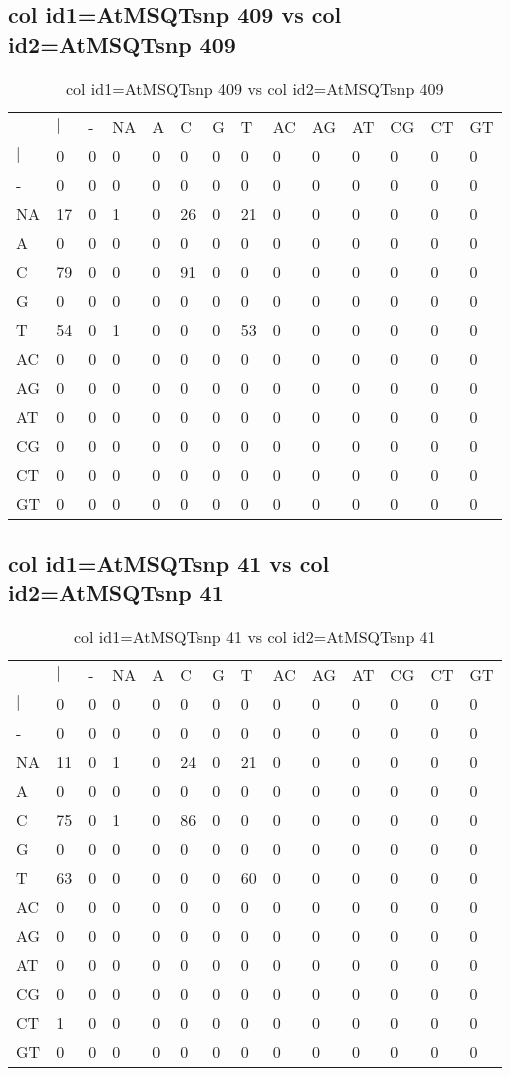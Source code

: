 \subsection{col id1=AtMSQTsnp 409 vs col id2=AtMSQTsnp 409}
\begin{center}
\begin{longtable}{|l|l|l|l|l|l|l|l|l|l|l|l|l|l|}
\caption{col id1=AtMSQTsnp 409 vs col id2=AtMSQTsnp 409} \label{table_dm926}\\
\hline
\\
\hline
&$|$&-&NA&A&C&G&T&AC&AG&AT&CG&CT&GT\\
$|$&0&0&0&0&0&0&0&0&0&0&0&0&0\\
-&0&0&0&0&0&0&0&0&0&0&0&0&0\\
NA&17&0&1&0&26&0&21&0&0&0&0&0&0\\
A&0&0&0&0&0&0&0&0&0&0&0&0&0\\
C&79&0&0&0&91&0&0&0&0&0&0&0&0\\
G&0&0&0&0&0&0&0&0&0&0&0&0&0\\
T&54&0&1&0&0&0&53&0&0&0&0&0&0\\
AC&0&0&0&0&0&0&0&0&0&0&0&0&0\\
AG&0&0&0&0&0&0&0&0&0&0&0&0&0\\
AT&0&0&0&0&0&0&0&0&0&0&0&0&0\\
CG&0&0&0&0&0&0&0&0&0&0&0&0&0\\
CT&0&0&0&0&0&0&0&0&0&0&0&0&0\\
GT&0&0&0&0&0&0&0&0&0&0&0&0&0\\
\hline
\end{longtable}
\end{center}

\subsection{col id1=AtMSQTsnp 41 vs col id2=AtMSQTsnp 41}
\begin{center}
\begin{longtable}{|l|l|l|l|l|l|l|l|l|l|l|l|l|l|}
\caption{col id1=AtMSQTsnp 41 vs col id2=AtMSQTsnp 41} \label{table_dm928}\\
\hline
\\
\hline
&$|$&-&NA&A&C&G&T&AC&AG&AT&CG&CT&GT\\
$|$&0&0&0&0&0&0&0&0&0&0&0&0&0\\
-&0&0&0&0&0&0&0&0&0&0&0&0&0\\
NA&11&0&1&0&24&0&21&0&0&0&0&0&0\\
A&0&0&0&0&0&0&0&0&0&0&0&0&0\\
C&75&0&1&0&86&0&0&0&0&0&0&0&0\\
G&0&0&0&0&0&0&0&0&0&0&0&0&0\\
T&63&0&0&0&0&0&60&0&0&0&0&0&0\\
AC&0&0&0&0&0&0&0&0&0&0&0&0&0\\
AG&0&0&0&0&0&0&0&0&0&0&0&0&0\\
AT&0&0&0&0&0&0&0&0&0&0&0&0&0\\
CG&0&0&0&0&0&0&0&0&0&0&0&0&0\\
CT&1&0&0&0&0&0&0&0&0&0&0&0&0\\
GT&0&0&0&0&0&0&0&0&0&0&0&0&0\\
\hline
\end{longtable}
\end{center}

